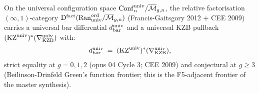 \begin{theorem}\ClaimStatusScoped
\label{thm:g2-healed-infty-global}
On the universal configuration space
$\mathrm{Conf}_n^{\mathrm{univ}}/\overline{\mathcal{M}}_{g,n}$, the relative factorisation
$(\infty,1)$-category $\mathrm{D}^{\mathrm{fact}}(\mathrm{Ran}^{\mathrm{ord}}_{\mathrm{univ}}/\overline{\mathcal{M}}_{g,n})$
(Francis-Gaitsgory 2012 + CEE 2009) carries a universal bar
differential $d_{\mathrm{bar}}^{\mathrm{univ}}$ and a universal KZB pullback
$(\mathrm{KZ}^{\mathrm{univ}})^{*}(\nabla_{\mathrm{KZB}}^{\mathrm{univ}})$ with:
\[
   d_{\mathrm{bar}}^{\mathrm{univ}}
   \;=\;
   (\mathrm{KZ}^{\mathrm{univ}})^{*}(\nabla_{\mathrm{KZB}}^{\mathrm{univ}}),
\]
strict equality at $g = 0, 1, 2$ (opus 04 Cycle 3; CEE 2009) and
conjectural at $g \ge 3$ (Beilinson-Drinfeld Green's function frontier;
this is the F5-adjacent frontier of the master synthesis).
\end{theorem}

